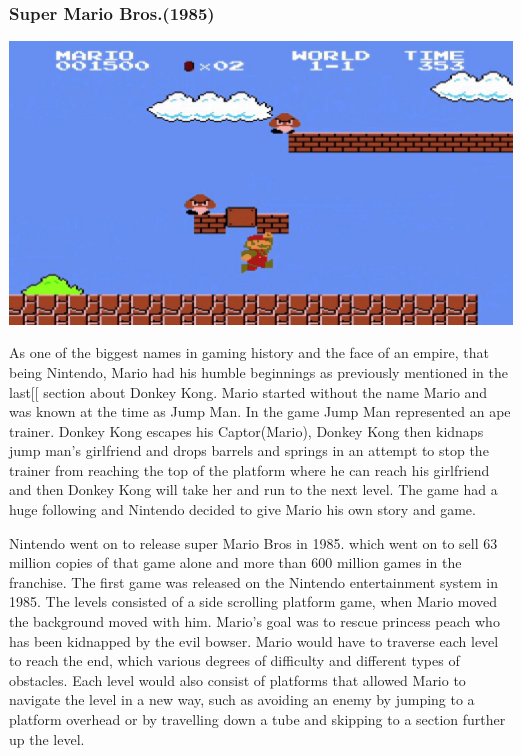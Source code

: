 \documentclass{article}
\begin{document}
\subsubsection{Super Mario Bros.(1985)}

\begin{minipage}{0.43\textwidth}
\includegraphics[width=\linewidth]{mario}
\end{minipage} \hfill
\begin{minipage}{0.55\textwidth}\raggedright
As one of the biggest names in gaming history and the face of an empire, that being Nintendo, Mario had his humble beginnings as previously mentioned in the last[[
 section about Donkey Kong. Mario started without the name Mario and was known at the time as Jump Man. In the game Jump Man represented an ape trainer. Donkey Kong escapes his Captor(Mario), Donkey Kong then kidnaps jump man's girlfriend and drops barrels and springs in an attempt to stop the trainer from reaching the top of the platform where he can reach his girlfriend and then Donkey Kong will take her and run to the next level. The game had a huge following and Nintendo decided to give Mario his own story and game.
\end{minipage} \newline 

Nintendo went on to release super Mario Bros in 1985. which went on to sell 63 million copies of that game alone and more than 600 million games in the franchise. The first game was released on the Nintendo entertainment system in 1985. The levels consisted of a side scrolling platform game, when Mario moved the background moved with him. Mario's goal was to rescue princess peach who has been kidnapped by the evil bowser. Mario would have to traverse each level to reach the end, which various degrees of difficulty and different types of obstacles. Each level would also consist of platforms that allowed Mario to navigate the level in a new way, such as avoiding an enemy by jumping to a platform overhead or by travelling down a tube and skipping to a section further up the level. \newline
\end{document}
